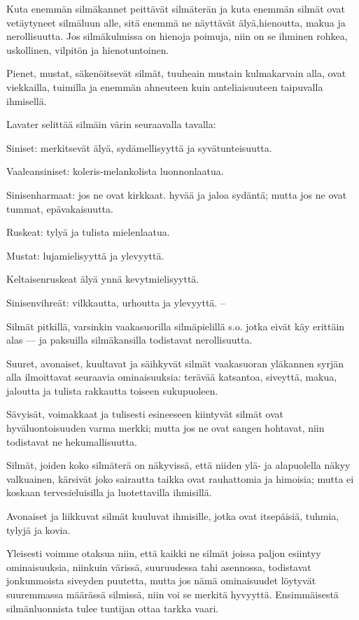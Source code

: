 \documentclass[11pt, twoside, finnish, a5paper]{book}
\begin{document}
Kuta enemmän silmäkannet peittävät silmäterän ja
kuta enemmän silmät ovat vetäytyneet silmäluun alle,
sitä enemmä ne näyttävät älyä,hienoutta, makua ja
nerollisuutta. Jos silmäkulmissa on hienoja poimuja,
niin on se ihminen rohkea, uskollinen,
vilpitön ja hienotuntoinen.
 
Pienet, mustat, säkenöitsevät silmät, tuuheain mustain
kulmakarvain alla, ovat viekkailla, tuimilla ja enemmän
ahneuteen kuin anteliaisuuteen taipuvalla ihmisellä.

Lavater selittää silmäin värin seuraavalla tavalla:

Siniset: merkitsevät älyä, sydämellisyyttä ja syvätunteisuutta.

Vaaleansiniset: koleris-melankolista luonnonlaatua.

Sinisenharmaat: jos ne ovat kirkkaat. hyvää ja jaloa
sydäntä; mutta jos ne ovat tummat, epävakaisuutta.

Ruskeat: tylyä ja tulista mielenlaatua.

Mustat: lujamielisyyttä ja ylevyyttä.

Keltaisenruskeat älyä ynnä kevytmielisyyttä.

Sinisenvihreät: vilkkautta, urhoutta ja ylevyyttä. –



Silmät pitkillä, varsinkin vaakasuorilla silmäpielillä s.o.
jotka eivät käy erittäin alas — ja paksuilla
silmäkansilla todistavat nerollisuutta.

Suuret, avonaiset, kuultavat ja säihkyvät silmät vaakasuoran yläkannen
syrjän alla ilmoittavat seuraavia
ominaisuuksia: terävää katsantoa, siveyttä, makua, jaloutta
ja tulista rakkautta toiseen sukupuoleen.

Sävyisät, voimakkaat ja tulisesti esineeseen kiintyvät
silmät ovat hyväluontoisuuden varma merkki; mutta
jos ne ovat sangen hohtavat, niin todistavat ne hekumallisuutta.

Silmät, joiden koko silmäterä on näkyvissä, että niiden
ylä- ja alapuolella näkyy valkuainen, kärsivät joko sairautta taikka ovat rauhattomia ja himoisia; mutta ei koskaan tervesieluisilla
ja luotettavilla ihmisillä.

Avonaiset ja liikkuvat silmät kuuluvat ihmisille, jotka
ovat itsepäisiä, tuhmia, tylyjä ja kovia.

Yleisesti voimme otaksua niin, että kaikki ne silmät
joissa paljon esiintyy ominaisuuksia, niinkuin värissä,
suuruudessa tahi asennossa, todistavat jonkunmoista
siveyden puutetta, mutta jos nämä ominaisuudet löytyvät
suuremmassa määrässä silmissä, niin voi se merkitä
hyvyyttä. Ensimmäisestä silmänluonnista tulee tuntijan
ottaa tarkka vaari.
\end{document}
